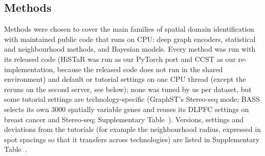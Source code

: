 \documentclass[unnumsec,webpdf,contemporary,large]{oup-authoring-template}
\begin{document}
\subsection{Methods}
Methods were chosen to cover the main families of spatial domain identification with maintained public code that runs on
CPU: deep graph encoders, statistical and neighbourhood methods, and Bayesian models. Every method was run with its released
code (HiSTaR was run as our PyTorch port and CCST as our re-implementation, because the released code does not run in the shared environment) and default or tutorial settings on one CPU thread (except the reruns on the second server, see below); none was tuned by us per dataset, but some tutorial settings are technology-specific (GraphST's Stereo-seq mode; BASS selects its own 3000 spatially variable genes and reuses its DLPFC settings on breast cancer and Stereo-seq; Supplementary Table~\STmethods). Versions, settings and deviations from
the tutorials (for example the neighbourhood radius, expressed in spot spacings so that it transfers across technologies) are
listed in Supplementary Table~\STmethods.
\end{document}
